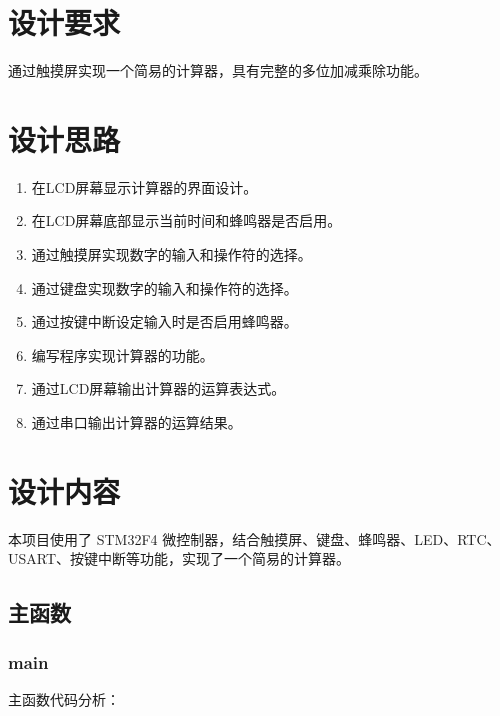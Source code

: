 \documentclass{course-thesis/theme-2639013-final}
\begin{document}

\makecover


\section{设计要求}

通过触摸屏实现一个简易的计算器，具有完整的多位加减乘除功能。

\section{设计思路}

\begin{enumerate}
  \item 在LCD屏幕显示计算器的界面设计。
  \item 在LCD屏幕底部显示当前时间和蜂鸣器是否启用。
  \item 通过触摸屏实现数字的输入和操作符的选择。
  \item 通过键盘实现数字的输入和操作符的选择。
  \item 通过按键中断设定输入时是否启用蜂鸣器。
  \item 编写程序实现计算器的功能。
  \item 通过LCD屏幕输出计算器的运算表达式。
  \item 通过串口输出计算器的运算结果。
\end{enumerate}

\section{设计内容}

本项目使用了 STM32F4 微控制器，结合触摸屏、键盘、蜂鸣器、LED、RTC、USART、按键中断等功能，实现了一个简易的计算器。

\subsection{主函数}

\subsubsection{main}

主函数代码分析：
\end{document}
